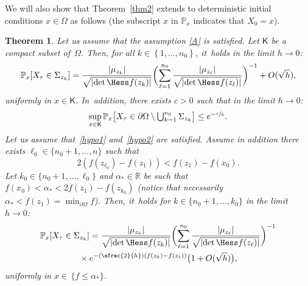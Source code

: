 \documentclass[JEP,XML,SOM,Unicode,NoEqCountersInSection,NoFloatCountersInSection,published]{cedram}
\newcommand{\Psfrac}[2]{(\sfrac{#1}{#2})}
\let\ts\textstyle
\theoremstyle{plain}
\newtheorem{theorem}{Theorem}
\theoremstyle{definition}
\begin{document}
We will also show that Theorem~\ref{thm2} extends to deterministic initial conditions $x\in
\Omega$ as follows (the subscript $x$ in $\mathbb P_{x}$ indicates
that $X_0=x$).
\begin{theorem}\label{thm3}
Let us assume that the assumption \ref{A} is satisfied. Let $\mathsf K$ be a compact subset of~$\Omega$. Then, for all $k\in \left\{1,\ldots,n_0\right\}$, it~holds in the limit $h\to 0$:
\begin{equation}\label{eq.px1}
\mathbb P_{x}[X_{\tau}\in \Sigma_{z_k}]= \frac{ \vert \mu_{z_k}\vert }{\sqrt{\vert {\det \Hess f (z_k)} \vert } }
\biggl (\sum_{\ell=1}^{n_0} \frac{ \vert \mu_{z_\ell}\vert }{\sqrt{\vert {\det \Hess f (z_\ell)} \vert } } \biggr)^{-1} + O({\sqrt h}),
\end{equation}
uniformly in $x\in \mathsf K$. In~addition, there exists $c>0$ such that in the limit $h\to 0$:
\begin{equation}\label{eq.px2}
\sup_{x\in \mathsf K}\mathbb P_{x}\bigl[X_{\tau}\in \partial \Omega \setminus\ts\bigcup_{k=1}^{n_0}\Sigma_{z_k}\bigr]\le e^{-\sfrac{c}{h}}.
\end{equation}
Let us assume that~\eqref{hypo1} and~\eqref{hypo2} are satisfied. Assume in addition there exists $\ell_0\in \{n_0+1,\ldots,n\}$ such
that
\begin{equation}\label{eq:hypo2_bis}
2(f(z_{\ell_0})-f(z_1))<f(z_1)-f(x_0).
\end{equation}
Let $k_0\in \{ n_0+1,\ldots,\ell_0\}$ and $ \alpha_* \in \mathbb R$ be such
that $f(x_0) < \alpha_*< 2 f(z_1)-f(z_{k_0})$ (notice that
necessarily $\alpha_*< f(z_1)=\min_{\partial \Omega}f$).
Then, it~holds for $k\in
\{ n_0+1,\ldots,k_0\}$ in the limit $h\to 0$:
\begin{multline}\label{eq.px3}
\mathbb P_{x}[X_{\tau}\in \Sigma_{z_k}]= \frac{ \vert \mu_{z_k}\vert }{\sqrt{\vert {\det \Hess f (z_k)} \vert } }
\biggl (\sum_{\ell=1}^{n_0} \frac{ \vert \mu_{z_\ell}\vert }{\sqrt{
\vert {\det \Hess f (z_\ell)} \vert } } \biggr)^{-1}\\
{}\times
e^{-\Psfrac{2}{h}(f(z_k)-f(z_1))}\bigl(1+ O({\sqrt h}) \bigr),
\end{multline}
uniformly in $x \in \, {\{ f\le \alpha_*\}}$.
\end{theorem}
\end{document}
